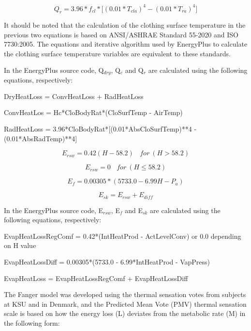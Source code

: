 \begin{equation}
{Q_{r}}=3.96*f_{cl}*{[}(0.01*T_{cla})^{4}-(0.01*T_{ra})^{4}{]}
\label{eq:FangerQr}
\end{equation}

It should be noted that the calculation of the clothing surface temperature in the previous two equations is based on ANSI/ASHRAE Standard 55-2020 and ISO 7730:2005. The equations and iterative algorithm used by EnergyPlus to calculate the clothing surface temperature variables are equivalent to these standards.

In the EnergyPlus source code, Q\(_{dry}\), Q\(_{c}\) and Q\(_{r}\) are calculated using the following equations, respectively:

DryHeatLoss = ConvHeatLoss + RadHeatLoss

ConvHeatLos = Hc*CloBodyRat*(CloSurfTemp - AirTemp)

RadHeatLoss = 3.96*CloBodyRat*{[}(0.01*AbsCloSurfTemp)**4 - (0.01*AbsRadTemp)**4{]}

\begin{equation}
{E_{rsw}} = 0.42(H - 58.2)~~~~for~\left(H > 58.2\right)
\end{equation}

\begin{equation}
{E_{rsw}} = 0~~~~for~\left(H \le 58.2\right)
\end{equation}

\begin{equation}
{E_{f}}=0.00305*(5733.0-6.99H-P_{a})
\end{equation}

\begin{equation}
{E_{sk}} = {E_{rsw}} + {E_{diff}}
\end{equation}

In the EnergyPlus source code, E\(_{rsw}\), E\(_{f}\) and E\(_{sk}\) are calculated using the following equations, respectively:

EvapHeatLossRegComf = 0.42*(IntHeatProd - ActLevelConv) or 0.0 depending on H value

EvapHeatLossDiff = 0.00305*(5733.0 - 6.99*IntHeatProd - VapPress)

EvapHeatLoss = EvapHeatLossRegComf + EvapHeatLossDiff

The Fanger model was developed using the thermal sensation votes from subjects at KSU and in Denmark, and the Predicted Mean Vote (PMV) thermal sensation scale is based on how the energy loss (L) deviates from the metabolic rate (M) in the following form:

